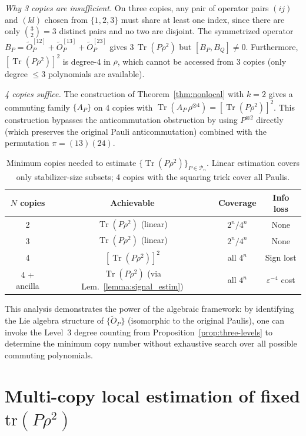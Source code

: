 \documentclass[aps,%
twocolumn,%
floatfix,%
pra,%
amsfonts,%
groupedaddress,%
superscriptaddress]{revtex4-2}%
\DeclareMathOperator{\tr}{Tr}
\newcommand{\ox}{\otimes}
\newcommand{\1}{\mathbbm{1}}
\newcommand*{\cP}{\mathcal{P}}
\begin{document}
\emph{Why 3 copies are insufficient.}
On three copies, any pair of operator pairs $(ij)$ and $(kl)$ chosen from $\{1,2,3\}$ must share at least one index, since there are only $\binom{3}{2} = 3$ distinct pairs and no two are disjoint. The symmetrized operator $B_P = \tilde{O}_P^{[12]} + \tilde{O}_P^{[13]} + \tilde{O}_P^{[23]}$ gives $3\,\tr(P\rho^2)$ but $[B_P, B_Q] \neq 0$. Furthermore, $[\tr(P\rho^2)]^2$ is degree-4 in $\rho$, which cannot be accessed from 3 copies (only degree $\leq 3$ polynomials are available).

\emph{4 copies suffice.}
The construction of Theorem~\ref{thm:nonlocal} with $k=2$ gives a commuting family $\{A_P\}$ on 4 copies with $\tr(A_P\,\rho^{\ox 4}) = [\tr(P\rho^2)]^2$. This construction bypasses the anticommutation obstruction by using $P^{\ox 2}$ directly (which preserves the original Pauli anticommutation) combined with the permutation $\pi = (13)(24)$.

\begin{table}[h]
\centering
\begin{tabular}{c|c|c|c}
$N$ \textbf{copies} & \textbf{Achievable} & \textbf{Coverage} & \textbf{Info loss} \\ \hline
2 & $\tr(P\rho^2)$ (linear) & $2^n/4^n$ & None \\
3 & $\tr(P\rho^2)$ (linear) & $2^n/4^n$ & None \\
4 & $[\tr(P\rho^2)]^2$ & all $4^n$ & Sign lost \\
4 + ancilla & $\tr(P\rho^2)$ (via Lem.~\ref{lemma:signal_estim}) & all $4^n$ & $\varepsilon^{-4}$ cost
\end{tabular}
\caption{Minimum copies needed to estimate $\{\tr(P\rho^2)\}_{P\in\cP_n}$. Linear estimation covers only stabilizer-size subsets; 4 copies with the squaring trick cover all Paulis.}
\label{tab:min_copies}
\end{table}

This analysis demonstrates the power of the algebraic framework: by identifying the Lie algebra structure of $\{\tilde{O}_P\}$ (isomorphic to the original Paulis), one can invoke the Level~3 degree counting from Proposition~\ref{prop:three-levels} to determine the minimum copy number without exhaustive search over all possible commuting polynomials.

\section{Multi-copy local estimation of fixed $\mathrm{tr}(P \rho^2)$}\label{app:local_est}
\end{document}

